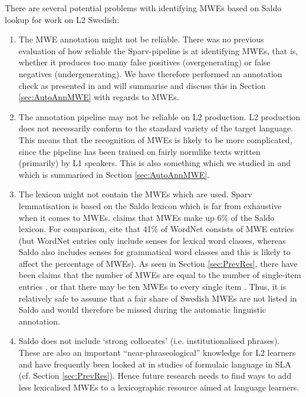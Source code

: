 \documentclass[output=paper,colorlinks,citecolor=brown]{langscibook}
\begin{document}
There are several potential problems with identifying MWEs based on Saldo lookup for work on L2 Swedish:
\begin{enumerate}
    \item The MWE annotation might not be reliable. There was no previous evaluation of how reliable the Sparv-pipeline is at identifying MWEs, that is, whether it produces too many false positives (overgenerating) or false negatives (undergenerating). We have therefore performed an annotation check as presented in \citet{volodina2022annotation} and will summarise and discuss this in Section \ref{sec:AutoAnnMWE} with regards to MWEs. 
    \item The annotation pipeline may not be reliable on L2 production. L2 production does not necessarily conform to the standard variety of the target language. This means that the recognition of MWEs is likely to be more complicated, since the pipeline has been trained on fairly normlike texts written (primarily) by L1 speakers. This is also something which we studied in \citet{volodina2022annotation} and which is summarised in Section \ref{sec:AutoAnnMWE}.
    \item The lexicon might not contain the MWEs which are used. Sparv lemmatisation is based on the Saldo lexicon which is far from exhaustive when it comes to MWEs. \citet{borin2021multiword} claims that MWEs make up 6\% of the Saldo lexicon. For comparison, \citet{Sag:Baldwin:2002} cite that 41\% of WordNet consists of MWE entries (but WordNet entries only include senses for lexical word classes, whereas Saldo also includes senses for grammatical word classes and this is likely to affect the percentage of MWEs). As seen in Section \ref{sec:PrevRes}, there have been claims that the number of MWEs are equal to the number of single-item entries \citep{jackendoff1997architecture}, or that there may be ten MWEs to every single item \citep{mel1998collocations}.  Thus, it is relatively safe to assume that a fair share of Swedish MWEs are not listed in Saldo and would therefore be missed during the automatic linguistic annotation. 
    \item Saldo 
    does not include `strong collocates' (i.e. institutionalised phrases). These are also an important “near-phraseological” knowledge for L2 learners and have frequently been looked at in studies of formulaic language in SLA (cf. Section \ref{sec:PrevRes}). Hence future research needs to find ways to add less lexicalised MWEs to a lexicographic resource aimed at language learners.
\end{enumerate}
\end{document}
